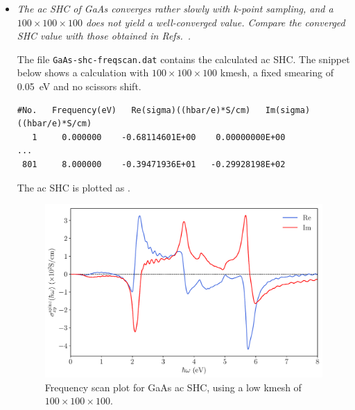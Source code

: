 \begin{itemize}
	\item {\it The ac SHC of GaAs converges rather slowly with k-point sampling, and a $100 \times 100 \times 100$ does not yield a well-converged value.
	Compare the converged SHC value with those obtained in Refs.~.}

	The file {\tt GaAs-shc-freqscan.dat} contains the calculated ac SHC. The snippet below shows a calculation with $100\times100\times100$ kmesh, a fixed smearing of 0.05~eV and no scissors shift.

\begin{tcolorbox}[title=$100\times100\times100$ kmesh,sharp corners,boxrule=0.5pt]
{\small
\begin{verbatim}
#No.   Frequency(eV)   Re(sigma)((hbar/e)*S/cm)   Im(sigma)((hbar/e)*S/cm)
   1     0.000000    -0.68114601E+00    0.00000000E+00
...
 801     8.000000    -0.39471936E+01   -0.29928198E+02
\end{verbatim}
}
\end{tcolorbox}

The ac SHC is plotted as .
\begin{figure}[htb!]
\centering
\includegraphics[width=.8\columnwidth]{figure/example30/gaas_freqscan_100kpt.pdf}
\caption{Frequency scan plot for GaAs ac SHC, using 
	a low kmesh of $100\times100\times100$.}
\label{fig30.1}
\end{figure}


\end{itemize}

